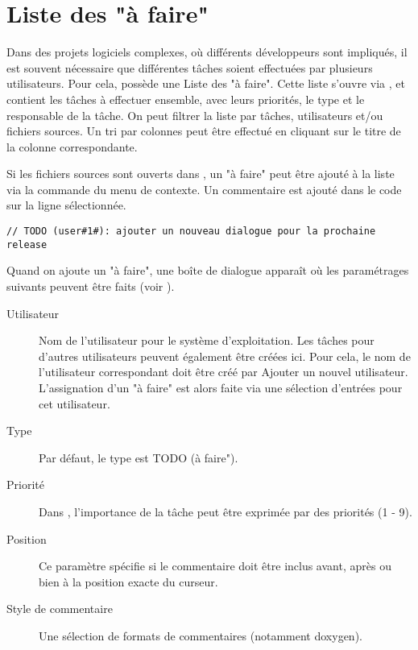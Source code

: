 \section{Liste des "à faire"}\label{sec:todo_list}

Dans des projets logiciels complexes, où différents développeurs sont impliqués, il est souvent nécessaire que différentes tâches soient effectuées par plusieurs utilisateurs. Pour cela, \codeblocks possède une Liste des "à faire". Cette liste s'ouvre via , et contient les tâches à effectuer ensemble, avec leurs priorités, le type et le responsable de la tâche. On peut filtrer la liste par tâches, utilisateurs et/ou fichiers sources. Un tri par colonnes peut être effectué en cliquant sur le titre de la colonne correspondante.



Si les fichiers sources sont ouverts dans \codeblocks, un "à faire" peut être ajouté à la liste via la commande  du menu de contexte. Un commentaire est ajouté dans le code sur la ligne sélectionnée.

\begin{lstlisting}
// TODO (user#1#): ajouter un nouveau dialogue pour la prochaine release
\end{lstlisting}

Quand on ajoute un "à faire", une boîte de dialogue apparaît où les paramétrages suivants peuvent être faits (voir ).


\begin{description}
\item[Utilisateur] Nom de l'utilisateur  pour le système d'exploitation. Les tâches pour d'autres utilisateurs peuvent également être créées ici. Pour cela, le nom de l'utilisateur correspondant doit être créé par Ajouter un nouvel utilisateur. L'assignation d'un "à faire" est alors faite via une sélection d'entrées pour cet utilisateur.

\item[Type] Par défaut, le type est TODO (à faire").
\item[Priorité] Dans \codeblocks, l'importance de la tâche peut être exprimée par des priorités (1 - 9).
\item[Position] Ce paramètre spécifie si le commentaire doit être inclus avant, après ou bien à la position exacte du curseur.
\item[Style de commentaire] Une sélection de formats de commentaires (notamment doxygen).
\end{description}
